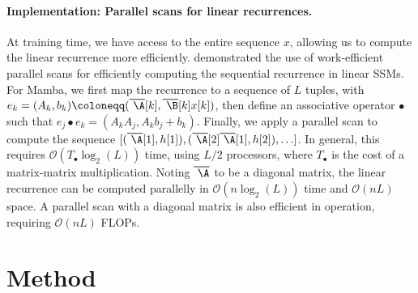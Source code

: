 \paragraph{Implementation: Parallel scans for linear recurrences.} At training time, we have access to the entire sequence $x$, allowing us to compute the linear recurrence more efficiently. \citet{smith2023simplified} demonstrated the use of work-efficient parallel scans \citep{blelloch1990prefix} for efficiently computing the sequential recurrence in linear SSMs. For Mamba, we first map the recurrence to a sequence of $L$ tuples, with $e_k = (A_k, b_k) \coloneqq (
    \vbox{
        \hrule height 0.55pt  
        \kern0.3ex  
        \hbox{
            \kern-0.0em  
            \ifmmode\A\else\ensuremath{\A}\fi  
            \kern-0.0em  
        } } [k], 
    \vbox{
        \hrule height 0.55pt  
        \kern0.3ex  
        \hbox{
            \kern-0.0em  
            \ifmmode\B\else\ensuremath{\B}\fi  
            \kern-0.0em  
        } } [k]x[k])$, then define an associative operator $\bullet$ such that $e_j \bullet e_k = (A_kA_j, A_kb_j + b_k)$. Finally, we apply a parallel scan to compute the sequence $[(
    \vbox{
        \hrule height 0.55pt  
        \kern0.3ex  
        \hbox{
            \kern-0.0em  
            \ifmmode\A\else\ensuremath{\A}\fi  
            \kern-0.0em  
        } } [1], h[1]), (
    \vbox{
        \hrule height 0.55pt  
        \kern0.3ex  
        \hbox{
            \kern-0.0em  
            \ifmmode\A\else\ensuremath{\A}\fi  
            \kern-0.0em  
        } } [2]
    \vbox{
        \hrule height 0.55pt  
        \kern0.3ex  
        \hbox{
            \kern-0.0em  
            \ifmmode\A\else\ensuremath{\A}\fi  
            \kern-0.0em  
        } } [1], h[2]), \ldots]$. In general, this requires $\mathcal{O}(T_\bullet \log_2(L))$ time, using $L/2$ processors, where $T_\bullet$ is the cost of a matrix-matrix multiplication. Noting $
    \vbox{
        \hrule height 0.55pt  
        \kern0.3ex  
        \hbox{
            \kern-0.0em  
            \ifmmode\A\else\ensuremath{\A}\fi  
            \kern-0.0em  
        } } $ to be a diagonal matrix, the linear recurrence can be computed parallelly in $\mathcal{O}(n \log_2(L))$ time and $\mathcal{O}(nL)$ space. A parallel scan with a diagonal matrix is also  efficient in operation, requiring $\mathcal{O}(nL)$ FLOPs.

\section{Method}
\label{sec:method}


